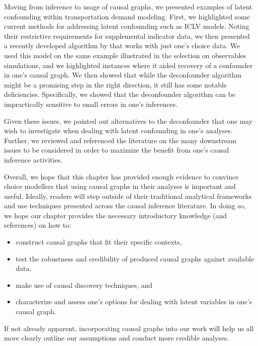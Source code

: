Moving from inference to usage of causal graphs, we presented examples of latent confounding within transportation demand modeling.
First, we highlighted some current methods for addressing latent confounding such as ICLV models.
Noting their restrictive requirements for supplemental indicator data,
we then presented a recently developed algorithm by \citet{wang_2019_blessings}
that works with just one's choice data.
We used this model on the same example illustrated in the selection on observables simulations,
and we highlighted instances where it aided recovery of a confounder in one's causal graph.
We then showed that while the deconfounder algorithm might be a promising step in the right direction,
it still has some notable deficiencies.
Specifically, we showed that the deconfounder algorithm can be impractically sensitive to small errors in one's inferences.

Given these issues, we pointed out alternatives to the deconfounder that one may wish to investigate when dealing with latent confounding in one's analyses.
Further, we reviewed and referenced the literature on the many downstream issues to be considered in order to maximize the benefit from one's causal inference activities.

Overall, we hope that this chapter has provided enough evidence to convince choice modellers that using causal graphs in their analyses is important and useful.
Ideally, readers will step outside of their traditional analytical frameworks and use techniques presented across the causal inference literature.
In doing so, we hope our chapter provides the necessary introductory knowledge (and references) on how to:
\begin{itemize}
    \item construct causal graphs that fit their specific contexts,
    \item test the robustness and credibility of produced causal graphs against available data,
    \item make use of causal discovery techniques, and
    \item characterize and assess one's options for dealing with latent variables in one's causal graph.
\end{itemize}
If not already apparent, incorporating causal graphs into our work will help us all more clearly outline our assumptions and conduct more credible analyses.
